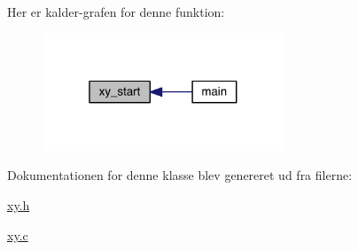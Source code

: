 Her er kalder-\/grafen for denne funktion\+:\nopagebreak
\begin{figure}[H]
\begin{center}
\leavevmode
\includegraphics[width=205pt]{db/d87/class_x_y_a47c6cc7fae92395e4d1231428c7070d4_icgraph}
\end{center}
\end{figure}




Dokumentationen for denne klasse blev genereret ud fra filerne\+:\begin{DoxyCompactItemize}
\item 
\hyperlink{xy_8h}{xy.\+h}\item 
\hyperlink{xy_8c}{xy.\+c}\end{DoxyCompactItemize}
